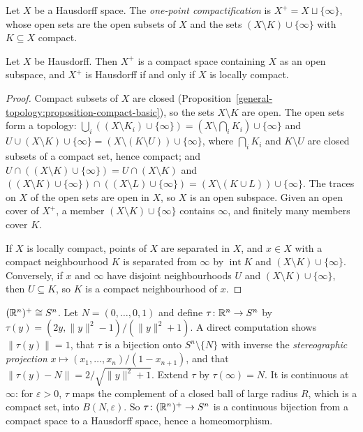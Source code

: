\begin{definition}\label{general-topology:definition-one-point-compactification}
Let $X$ be a Hausdorff space. The \emph{one-point compactification} is $X^+ = X \sqcup \{\infty\}$, whose open sets are the open subsets of $X$ and the sets
$(X \setminus K) \cup \{\infty\}$ with $K \subseteq X$ compact.
\end{definition}

\begin{theorem}\label{general-topology:theorem-one-point-compactification}
Let $X$ be Hausdorff. Then $X^+$ is a compact space containing $X$ as an open subspace, and $X^+$ is Hausdorff if and only if $X$ is locally compact.
\end{theorem}

\begin{proof}
Compact subsets of $X$ are closed (Proposition~\ref{general-topology:proposition-compact-basic}), so the sets $X \setminus K$ are open. The open sets
form a topology: $\bigcup_i ((X \setminus K_i) \cup \{\infty\}) = (X \setminus \bigcap_i K_i) \cup \{\infty\}$ and
$U \cup (X \setminus K) \cup \{\infty\} = (X \setminus (K \setminus U)) \cup \{\infty\}$, where $\bigcap_i K_i$ and $K \setminus U$ are closed subsets of a
compact set, hence compact; and $U \cap ((X \setminus K) \cup \{\infty\}) = U \cap (X \setminus K)$ and
$((X \setminus K) \cup \{\infty\}) \cap ((X \setminus L) \cup \{\infty\}) = (X \setminus (K \cup L)) \cup \{\infty\}$. The traces on $X$ of the open sets
are open in $X$, so $X$ is an open subspace. Given an open cover of $X^+$, a member $(X \setminus K) \cup \{\infty\}$ contains $\infty$, and finitely many
members cover $K$.

If $X$ is locally compact, points of $X$ are separated in $X$, and $x \in X$ with a compact neighbourhood $K$ is separated from $\infty$ by
$\operatorname{int} K$ and $(X \setminus K) \cup \{\infty\}$. Conversely, if $x$ and $\infty$ have disjoint neighbourhoods $U$ and $(X \setminus K) \cup \{\infty\}$,
then $U \subseteq K$, so $K$ is a compact neighbourhood of $x$.
\end{proof}

\begin{example}\label{general-topology:example-stereographic}
$(\mathbb{R}^n)^+ \cong S^n$. Let $N = (0, \ldots, 0, 1)$ and define $\tau \colon \mathbb{R}^n \to S^n$ by
$\tau(y) = (2y, \|y\|^2 - 1)/(\|y\|^2 + 1)$. A direct computation shows $\|\tau(y)\| = 1$, that $\tau$ is a bijection onto $S^n \setminus \{N\}$ with inverse
the \emph{stereographic projection} $x \mapsto (x_1, \ldots, x_n)/(1 - x_{n+1})$, and that $\|\tau(y) - N\| = 2/\sqrt{\|y\|^2 + 1}$. Extend $\tau$ by
$\tau(\infty) = N$. It is continuous at $\infty$: for $\varepsilon > 0$, $\tau$ maps the complement of a closed ball of large radius $R$, which is a compact
set, into $B(N, \varepsilon)$. So $\tau \colon (\mathbb{R}^n)^+ \to S^n$ is a continuous bijection from a compact space to a Hausdorff space, hence a homeomorphism.
\end{example}

